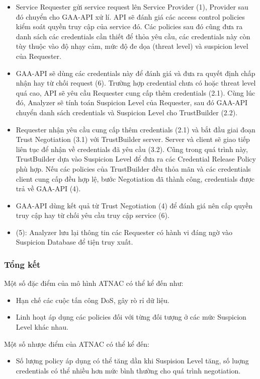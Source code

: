 \documentclass[12pt]{article}
\begin{document}
\begin{itemize}
\item Service Requester gửi service request lên Service Provider (1), Provider sau đó chuyển cho GAA-API xử lí. API sẽ đánh giá các access control policies kiểm soát quyền truy cập của service đó. Các policies sau đó cũng đưa ra danh sách các credentials cần thiết để thỏa yêu cầu, các credentials này còn tùy thuộc vào độ nhạy cảm, mức độ đe dọa (threat level) và suspicion level của Requester.
\item GAA-API sẽ dùng các credentials này để đánh giá và đưa ra quyết định chấp nhận hay từ chối request (6). Trường hợp credential chưa có hoặc threat level quá cao, API sẽ yêu cầu Requester cung cấp thêm credentials (2.1). Cùng lúc đó, Analyzer sẽ tính toán Suspicion Level của Requester, sau đó GAA-API chuyển danh sách credentials và Suspicion Level cho TrustBuilder (2.2).
\item Requester nhận yêu cầu cung cấp thêm credentials (2.1) và bắt đầu giai đoạn Trust Negotiation (3.1) với TrustBuilder server. Server và client sẽ giao tiếp liên tục để nhận về credentials đã yêu cầu (3.2). Cũng trong quá trình này, TrustBuilder dựa vào Suspicion Level để đưa ra các Credential Release Policy phù hợp. Nếu các policies của TrustBuilder đều thỏa mãn và các credentials client cung cấp đều hợp lệ, bước Negotiation đã thành công, credentials được trả về GAA-API (4).
\item GAA-API dùng kết quả từ Trust Negotiation (4) để đánh giá nên cấp quyền truy cập hay từ chối yêu cầu truy cập service (6).
\item (5): Analyzer lưu lại thông tin các Requester có hành vi đáng ngờ vào Suspicion Database để tiện truy xuất.
\end{itemize}

\subsubsection{Tổng kết}
Một số đặc điểm của mô hình ATNAC có thể kể đến như:
\begin{itemize}
\item Hạn chế các cuộc tấn công DoS, gây rò rỉ dữ liệu.
\item Linh hoạt áp dụng các policies đối với từng đối tượng ở các mức Suspicion Level khác nhau.
\end{itemize}
Một số nhược điểm của ATNAC có thể kể đến:
\begin{itemize}
\item Số lượng policy áp dụng có thể tăng dần khi Suspision Level tăng, số luợng credentials có thể nhiều hơn mức bình thường cho quá trình negotiation.
\end{itemize}
\end{document}
